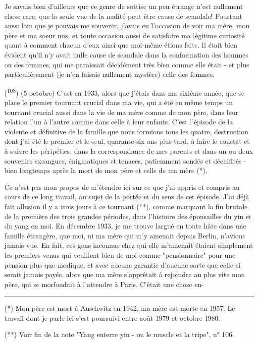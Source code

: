 

Je savais bien d'ailleurs que ce genre de sottise un peu étrange n'est nullement chose rare, que la seule vue de la nudité peut être cause de scandale! Pourtant aussi loin que je pouvais me souvenir, j'avais eu l'occasion de voir ma mère, mon père et ma soeur nus, et toute occasion aussi de satisfaire ma légitime curiosité quant à comment chacun d'eux ainsi que moi-même étions faits. Il était bien évident qu'il n'y avait nulle cause de scandale dans la conformation des hommes ou des femmes, qui me paraissait décidément très bien comme elle était - et plus particulièrement (je n'en faisais nullement mystère) celle des femmes.

(\textsuperscript{108}) (5 octobre) C'est en 1933, alors que j'étais dans ma sixième année, que se place le premier tournant crucial dans ma vie, qui a été en même temps un tournant crucial aussi dans la vie de ma mère comme de mon père, dans leur relation l'un à l'autre comme dans celle à leur enfants. C'est l'épisode de la  violente et définitive de la famille que nous formions tous les quatre, destruction dont j'ai été le premier et le seul, quarante-six ans plus tard, à faire le constat et à suivre les péripéties, dans la correspondance de mes parents et dans un ou deux souvenirs exsangues, énigmatiques et tenaces, patiemment sondés et déchiffrés - bien longtemps après la mort de mon père et celle de ma mère (*).

Ce n'est pas mon propos de m'étendre ici sur ce que j'ai appris et compris au cours de ce long travail, au sujet de la portée et du sens de cet épisode. J'ai déjà fait allusion il y a trois jours à ce tournant (**), comme marquant la fin brutale de la première des trois grandes périodes, dans l'histoire des épousailles du yin et du yang en moi. En décembre 1933, je me trouve largué en toute hâte dans une famille étrangère, que moi, ni ma mère qui m'y amenait depuis Berlin, n'avions jamais vue. En fait, ces gens inconnus chez qui elle m'amenait étaient simplement les premiers venus qui veuillent bien de moi comme "pensionnaire" pour une pension plus que modique, et avec aucune garantie d'aucune sorte que celle-ci serait jamais payée, alors que ma mère s'apprêtait à rejoindre au plus vite mon père, qui se morfondait à l'attendre à Paris. C'était une chose en-

\noindent\rule{5em}{0.4pt}\par
(*) Mon père est mort à Auschwitz en 1942, ma mère est morte en 1957. Le travail dont je parle ici s'est poursuivi entre août 1979 et octobre 1980.

(**) Voir fin de la note "Yang enterre yin - ou le muscle et la tripe", n° 106.

